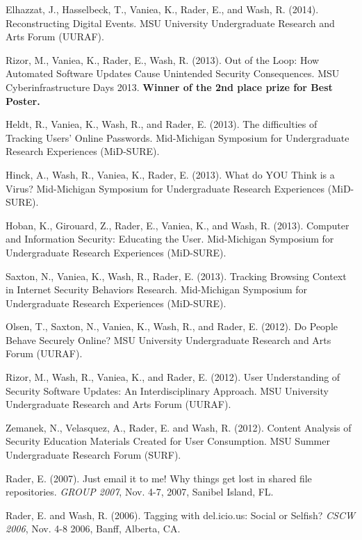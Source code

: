 \documentclass[9pt]{extarticle}
\makeatletter
\renewcommand{\section}{%
  \@startsection{section}{1}{0em}{\baselineskip}{3pt}{\large\bfseries\textsc}}
\makeatother
\begin{document}
Elhazzat, J., Hasselbeck, T., Vaniea, K., Rader, E., and Wash, R. (2014). Reconstructing Digital Events. MSU University Undergraduate Research and Arts Forum (UURAF).

Rizor, M., Vaniea, K., Rader, E., Wash, R. (2013). Out of the Loop: How Automated Software Updates Cause Unintended Security Consequences. MSU Cyberinfrastructure Days 2013. \textbf{Winner of the 2nd place prize for Best Poster.}

Heldt, R., Vaniea, K., Wash, R., and Rader, E. (2013). The difficulties of Tracking Users' Online Passwords. Mid-Michigan Symposium for Undergraduate Research Experiences (MiD-SURE). 

Hinck, A., Wash, R., Vaniea, K., Rader, E. (2013). What do YOU Think is a Virus? Mid-Michigan Symposium for Undergraduate Research Experiences (MiD-SURE).

Hoban, K., Girouard, Z., Rader, E., Vaniea, K., and Wash, R. (2013). Computer and Information Security: Educating the User. Mid-Michigan Symposium for Undergraduate Research Experiences (MiD-SURE).

Saxton, N., Vaniea, K., Wash, R., Rader, E. (2013). Tracking Browsing Context in Internet Security Behaviors Research. Mid-Michigan Symposium for Undergraduate Research Experiences (MiD-SURE).

Olsen, T., Saxton, N., Vaniea, K., Wash, R., and Rader, E. (2012). Do People Behave Securely Online? MSU University Undergraduate Research and Arts Forum (UURAF).

Rizor, M., Wash, R., Vaniea, K., and Rader, E. (2012). User Understanding of Security Software Updates: An Interdisciplinary Approach. MSU University Undergraduate Research and Arts Forum (UURAF).

Zemanek, N., Velasquez, A., Rader, E. and Wash, R. (2012). Content Analysis of Security Education Materials Created for User Consumption. MSU Summer Undergraduate Research Forum (SURF).
  
Rader, E. (2007). Just email it to me! Why things get lost in shared file repositories. \emph{GROUP 2007}, Nov. 4-7, 2007, Sanibel Island, FL.

Rader, E. and Wash, R. (2006). Tagging with del.icio.us: Social or Selfish? \emph{CSCW 2006}, Nov. 4-8 2006, Banff, Alberta, CA.
 

\section{External Presentations}
\end{document}
